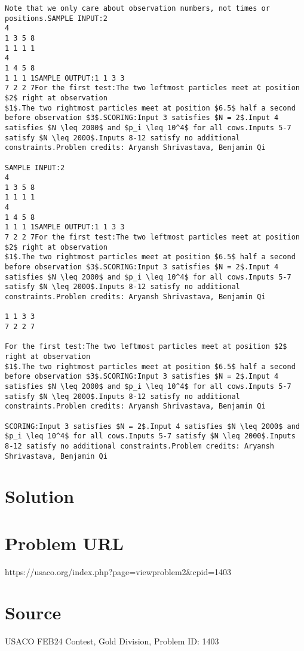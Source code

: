 \documentclass[12pt]{article}
\begin{document}
\begin{verbatim}
Note that we only care about observation numbers, not times or positions.SAMPLE INPUT:2
4
1 3 5 8
1 1 1 1
4
1 4 5 8
1 1 1 1SAMPLE OUTPUT:1 1 3 3
7 2 2 7For the first test:The two leftmost particles meet at position $2$ right at observation
$1$.The two rightmost particles meet at position $6.5$ half a second
before observation $3$.SCORING:Input 3 satisfies $N = 2$.Input 4 satisfies $N \leq 2000$ and $p_i \leq 10^4$ for all cows.Inputs 5-7 satisfy $N \leq 2000$.Inputs 8-12 satisfy no additional constraints.Problem credits: Aryansh Shrivastava, Benjamin Qi

SAMPLE INPUT:2
4
1 3 5 8
1 1 1 1
4
1 4 5 8
1 1 1 1SAMPLE OUTPUT:1 1 3 3
7 2 2 7For the first test:The two leftmost particles meet at position $2$ right at observation
$1$.The two rightmost particles meet at position $6.5$ half a second
before observation $3$.SCORING:Input 3 satisfies $N = 2$.Input 4 satisfies $N \leq 2000$ and $p_i \leq 10^4$ for all cows.Inputs 5-7 satisfy $N \leq 2000$.Inputs 8-12 satisfy no additional constraints.Problem credits: Aryansh Shrivastava, Benjamin Qi

1 1 3 3
7 2 2 7

For the first test:The two leftmost particles meet at position $2$ right at observation
$1$.The two rightmost particles meet at position $6.5$ half a second
before observation $3$.SCORING:Input 3 satisfies $N = 2$.Input 4 satisfies $N \leq 2000$ and $p_i \leq 10^4$ for all cows.Inputs 5-7 satisfy $N \leq 2000$.Inputs 8-12 satisfy no additional constraints.Problem credits: Aryansh Shrivastava, Benjamin Qi

SCORING:Input 3 satisfies $N = 2$.Input 4 satisfies $N \leq 2000$ and $p_i \leq 10^4$ for all cows.Inputs 5-7 satisfy $N \leq 2000$.Inputs 8-12 satisfy no additional constraints.Problem credits: Aryansh Shrivastava, Benjamin Qi
\end{verbatim}

\section*{Solution}


\section*{Problem URL}
https://usaco.org/index.php?page=viewproblem2&cpid=1403

\section*{Source}
USACO FEB24 Contest, Gold Division, Problem ID: 1403
\end{document}
